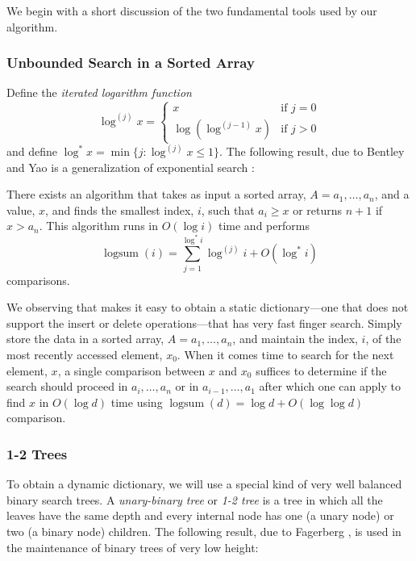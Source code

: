 \documentclass{patmorin}
\DeclareMathOperator{\logsum}{logsum}
\begin{document}
We begin with a short discussion of the two fundamental tools used by
our algorithm.

\subsubsection{Unbounded Search in a Sorted Array}

Define the \emph{iterated logarithm function}
\[
    \log^{(j)} x = \begin{cases}
       x & \text{if $j=0$} \\
       \log(\log^{(j-1)} x) & \text{if $j>0$}
    \end{cases}
\]
and define $\log^* x=\min\{j: \log^{(j)} x \le 1\}$.  The following result,
due to Bentley and Yao \cite{bentley.yao.XX} is a generalization of
exponential search \cite{X}:

\begin{thm}
There exists an algorithm that takes as input a sorted array,
$A=a_1,\ldots,a_n$, and a value, $x$, and finds the smallest index, $i$,
such that $a_i\ge x$ or returns $n+1$ if $x>a_n$.  This algorithm runs
in $O(\log i)$ time and performs
\[
    \logsum(i) = \sum_{j=1}^{\log^* i} \log^{(j)} i + O(\log^* i)
\]
comparisons.
\end{thm}

We observing that  makes it easy to obtain a
static dictionary---one that does not support the insert or delete
operations---that has very fast finger search.  Simply store the data in
a sorted array, $A=a_1,\ldots,a_n$, and maintain the index, $i$, of the
most recently accessed element, $x_0$.  When it comes time to search
for the next element, $x$, a single comparison between $x$ and $x_0$
suffices to determine if the search should proceed in $a_i,\ldots, a_n$
or in $a_{i-1},\ldots,a_1$ after which one can apply 
to find $x$ in $O(\log d)$ time using $\logsum(d)=\log d + O(\log\log d)$ comparison.


\subsubsection{1-2 Trees}

To obtain a dynamic dictionary, we will use a special kind of very well
balanced binary search trees.  A \emph{unary-binary tree} or \emph{1-2
tree} is a tree in which all the leaves have the same depth and every
internal node has one (a unary node) or two (a binary node) children.
The following result, due to Fagerberg \cite{X}, is used in the
maintenance of binary trees of very low height:
\end{document}
